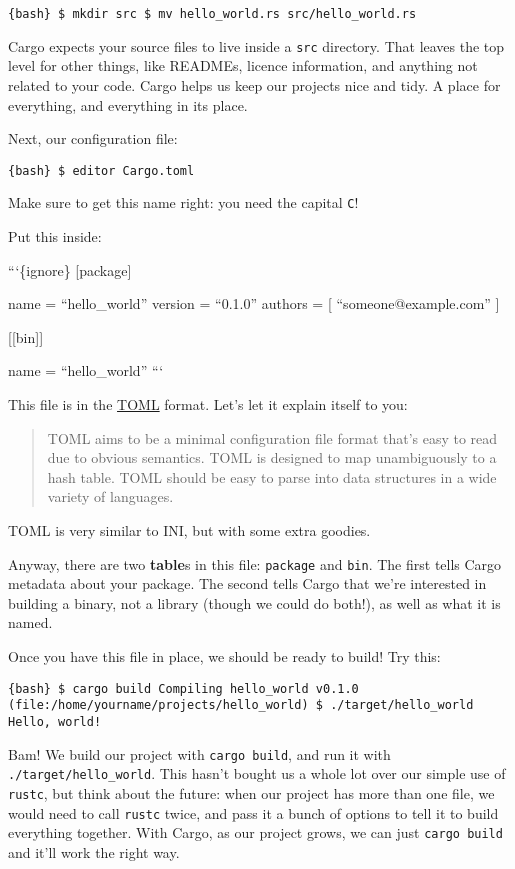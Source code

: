 \documentclass[]{article}
\begin{document}
\texttt{\{bash\} \$ mkdir src \$ mv hello\_world.rs src/hello\_world.rs}

Cargo expects your source files to live inside a \texttt{src} directory.
That leaves the top level for other things, like READMEs, licence
information, and anything not related to your code. Cargo helps us keep
our projects nice and tidy. A place for everything, and everything in
its place.

Next, our configuration file:

\texttt{\{bash\} \$ editor Cargo.toml}

Make sure to get this name right: you need the capital \texttt{C}!

Put this inside:

```\{ignore\} {[}package{]}

name = ``hello\_world'' version = ``0.1.0'' authors = {[}
``someone@example.com'' {]}

{[}{[}bin{]}{]}

name = ``hello\_world'' ```

This file is in the \href{https://github.com/toml-lang/toml}{TOML}
format. Let's let it explain itself to you:

\begin{quote}
TOML aims to be a minimal configuration file format that's easy to read
due to obvious semantics. TOML is designed to map unambiguously to a
hash table. TOML should be easy to parse into data structures in a wide
variety of languages.
\end{quote}

TOML is very similar to INI, but with some extra goodies.

Anyway, there are two \textbf{table}s in this file: \texttt{package} and
\texttt{bin}. The first tells Cargo metadata about your package. The
second tells Cargo that we're interested in building a binary, not a
library (though we could do both!), as well as what it is named.

Once you have this file in place, we should be ready to build! Try this:

\texttt{\{bash\} \$ cargo build    Compiling hello\_world v0.1.0 (file:/home/yourname/projects/hello\_world) \$ ./target/hello\_world  Hello, world!}

Bam! We build our project with \texttt{cargo build}, and run it with
\texttt{./target/hello\_world}. This hasn't bought us a whole lot over
our simple use of \texttt{rustc}, but think about the future: when our
project has more than one file, we would need to call \texttt{rustc}
twice, and pass it a bunch of options to tell it to build everything
together. With Cargo, as our project grows, we can just
\texttt{cargo build} and it'll work the right way.
\end{document}
